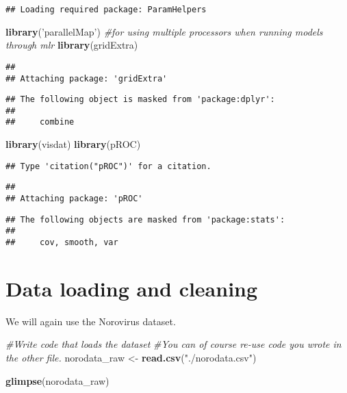 \documentclass[]{article}
\newenvironment{Shaded}{\begin{snugshade}}{\end{snugshade}}
\newcommand{\CommentTok}[1]{\textcolor[rgb]{0.56,0.35,0.01}{\textit{#1}}}
\newcommand{\KeywordTok}[1]{\textcolor[rgb]{0.13,0.29,0.53}{\textbf{#1}}}
\newcommand{\NormalTok}[1]{#1}
\newcommand{\StringTok}[1]{\textcolor[rgb]{0.31,0.60,0.02}{#1}}
\begin{document}
\begin{verbatim}
## Loading required package: ParamHelpers
\end{verbatim}

\begin{Shaded}
\begin{Highlighting}[]
\KeywordTok{library}\NormalTok{(}\StringTok{'parallelMap'}\NormalTok{) }\CommentTok{#for using multiple processors when running models through mlr}
\KeywordTok{library}\NormalTok{(gridExtra)}
\end{Highlighting}
\end{Shaded}

\begin{verbatim}
## 
## Attaching package: 'gridExtra'
\end{verbatim}

\begin{verbatim}
## The following object is masked from 'package:dplyr':
## 
##     combine
\end{verbatim}

\begin{Shaded}
\begin{Highlighting}[]
\KeywordTok{library}\NormalTok{(visdat)}
\KeywordTok{library}\NormalTok{(pROC)}
\end{Highlighting}
\end{Shaded}

\begin{verbatim}
## Type 'citation("pROC")' for a citation.
\end{verbatim}

\begin{verbatim}
## 
## Attaching package: 'pROC'
\end{verbatim}

\begin{verbatim}
## The following objects are masked from 'package:stats':
## 
##     cov, smooth, var
\end{verbatim}

\hypertarget{data-loading-and-cleaning}{%
\section{Data loading and cleaning}\label{data-loading-and-cleaning}}

We will again use the Norovirus dataset.

\begin{Shaded}
\begin{Highlighting}[]
\CommentTok{#Write code that loads the dataset }
\CommentTok{#You can of course re-use code you wrote in the other file.}
\NormalTok{norodata_raw <-}\StringTok{ }\KeywordTok{read.csv}\NormalTok{(}\StringTok{"./norodata.csv"}\NormalTok{)}

\KeywordTok{glimpse}\NormalTok{(norodata_raw)}
\end{Highlighting}
\end{Shaded}
\end{document}
